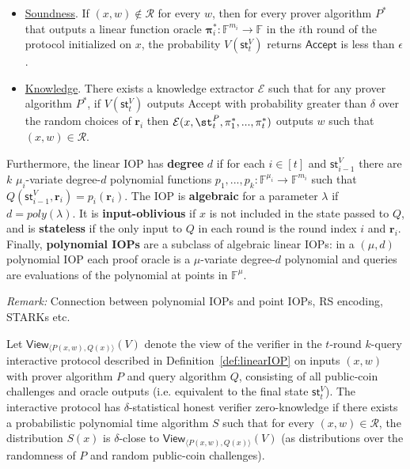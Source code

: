 \begin{definition} 
\begin{itemize}
\item \underline{Soundness}. If $(x, w) \notin \mathcal{R}$ for every $w$, then for every prover algorithm $P^*$ that outputs a linear function oracle $\boldsymbol{\pi}^*_i: \mathbb{F}^{m_i} \rightarrow \mathbb{F}$ in the $i$th round of the protocol initialized on $x$, the probability $V(\textsf{st}^V_t)$ returns $\textsf{Accept}$ is less than $\epsilon$. 

\item \underline{Knowledge}. There exists a knowledge extractor $\mathcal{E}$ such that for any prover algorithm $P^*$, if $V(\textsf{st}^V_t)$ outputs \textsf{Accept} with probability greater than $\delta$ over the random choices of $\mathbf{r}_i$ then $\mathcal{E}(x, \st_t^P, \pi_1^*,...,\pi_t^*)$ outputs $w$ such that $(x, w) \in \mathcal{R}$.

\end{itemize}

Furthermore, the linear IOP has \textbf{degree} $d$ if for each $i \in [t]$ and $\textsf{st}^V_{i-1}$ there are $k$ $\mu_i$-variate degree-$d$ polynomial functions $p_1,...,p_k: \mathbb{F}^{\mu_i} \rightarrow \mathbb{F}^{m_i}$ such that $Q(\textsf{st}^V_{i-1}, \mathbf{r}_i) = p_i(\mathbf{r}_i)$. The IOP is \textbf{algebraic} for a parameter $\lambda$ if $d = poly(\lambda)$. 
It is \textbf{input-oblivious} if $x$ is not included in the state passed to $Q$, and is \textbf{stateless} if the only input to $Q$ in each round is the round index $i$ and $\mathbf{r}_i$.
Finally, \textbf{polynomial IOPs} are a subclass of algebraic linear IOPs: in a $(\mu, d)$ polynomial IOP each proof oracle is a $\mu$-variate degree-$d$ polynomial and queries are evaluations of the polynomial at points in $\mathbb{F}^\mu$. 
\end{definition} 

\emph{Remark:} Connection between polynomial IOPs and point IOPs, RS encoding, STARKs etc. 

\begin{definition}
Let $\textsf{View}_{\langle P(x, w), Q(x) \rangle}(V)$ denote the view of the verifier in the $t$-round $k$-query interactive protocol described in Definition~\ref{def:linearIOP} on inputs $(x,w)$ with prover algorithm $P$ and query algorithm $Q$, consisting of all public-coin challenges and oracle outputs (i.e. equivalent to the final state $\textsf{st}^V_t$). The interactive protocol has $\delta$-statistical honest verifier zero-knowledge if there exists a probabilistic polynomial time algorithm $S$ such that for every $(x, w) \in \mathcal{R}$, the distribution $S(x)$ is $\delta$-close to $\textsf{View}_{\langle P(x, w), Q(x) \rangle}(V)$ (as distributions over the randomness of $P$ and random public-coin challenges).
\end{definition}

